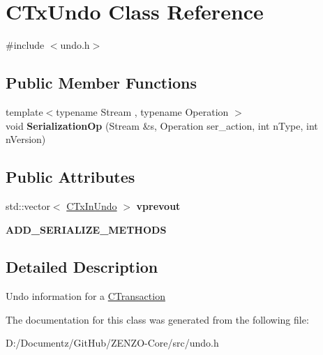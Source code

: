 \hypertarget{class_c_tx_undo}{}\section{C\+Tx\+Undo Class Reference}
\label{class_c_tx_undo}


{\ttfamily \#include $<$undo.\+h$>$}

\subsection*{Public Member Functions}
\begin{DoxyCompactItemize}
\item 
\mbox{\label{class_c_tx_undo_acded3ea0adf0309c160ea756a2361bf2}} 
{\footnotesize template$<$typename Stream , typename Operation $>$ }\\void {\bfseries Serialization\+Op} (Stream \&s, Operation ser\+\_\+action, int n\+Type, int n\+Version)
\end{DoxyCompactItemize}
\subsection*{Public Attributes}
\begin{DoxyCompactItemize}
\item 
\mbox{\label{class_c_tx_undo_a035e62f0b46f0d4ba392dad686ed18de}} 
std\+::vector$<$ \mbox{\hyperlink{class_c_tx_in_undo}{C\+Tx\+In\+Undo}} $>$ {\bfseries vprevout}
\item 
\mbox{\label{class_c_tx_undo_a8b7b4f167a00e200723165b3446cc4c4}} 
{\bfseries A\+D\+D\+\_\+\+S\+E\+R\+I\+A\+L\+I\+Z\+E\+\_\+\+M\+E\+T\+H\+O\+DS}
\end{DoxyCompactItemize}


\subsection{Detailed Description}
Undo information for a \mbox{\hyperlink{class_c_transaction}{C\+Transaction}} 

The documentation for this class was generated from the following file\+:\begin{DoxyCompactItemize}
\item 
D\+:/\+Documentz/\+Git\+Hub/\+Z\+E\+N\+Z\+O-\/\+Core/src/undo.\+h\end{DoxyCompactItemize}
